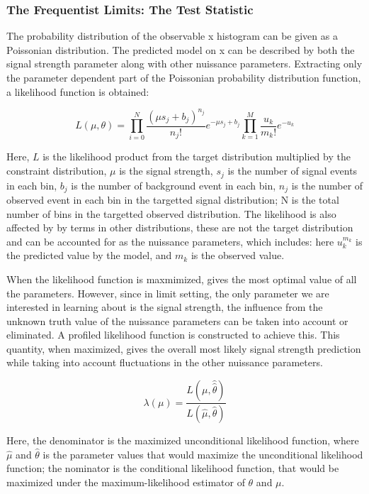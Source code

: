 \subsubsection{The Frequentist Limits: The Test Statistic}
\label{sec:freqTestStats}

The probability distribution of the observable x histogram can be given as a Poissonian distribution. The predicted model on x can be described by both the signal strength parameter along with other nuissance parameters. Extracting only the parameter dependent part of the Poissonian probability distribution function, a likelihood function is obtained:

\begin{equation}
    L(\mu, \theta) =  \prod_{i=0}^{N} \frac{(\mu s_{j} + b_{j})^{n_j}}{n_{j}!}e^{-\mu s_j + b_j} \prod_{k=1}^{M}\frac{u_{k}}
{m_{k}!} e^{-u_{k}}
\label{eq:likelihood}
\end{equation}

Here, $L$ is the likelihood product from the target distribution multiplied by the constraint distribution, $\mu$ is the signal strength, $s_j$ is the number of signal events in each bin, $b_j$ is the number of background event in each bin, $n_j$ is the number of observed event in each bin in the targetted signal distribution; N is the total number of bins in the targetted observed distribution. The likelihood is also affected by by terms in other distributions, these
are not the target distribution and can be accounted for as the nuissance parameters, which
includes:
here $u_k^{m_k}$ is the predicted value by the model, and $m_{k}$ is the observed value. 

When the likelihood function is maxmimized, gives the most optimal value of all the parameters. However, since in limit setting, the only parameter we are interested in learning about is the signal strength, the influence from the unknown truth value of the nuissance parameters can be taken into account or eliminated. A profiled likelihood function is constructed to achieve this. This quantity, when maximized, gives the overall most likely signal strength prediction while taking into account fluctuations in the other nuissance parameters. 

\begin{equation}
\lambda(\mu) = \frac{L(\mu, \hat{\hat{\theta}})}{L(\hat{\mu}, \hat{\theta})}
\label{eq:profilelikelihood}
\end{equation}

Here, the denominator is the maximized unconditional likelihood function, where $\hat{\mu}$ and $\hat{\theta}$ is the parameter values that would maximize the unconditional likelihood function; the nominator is the conditional likelihood function, that would be maximized under the maximum-likelihood estimator of $\theta$ and $\mu$. 

